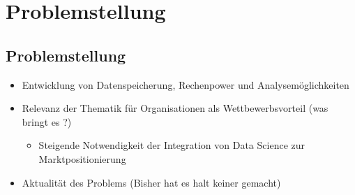 \chapter[Problemstellung]{Problemstellung}

\section{Problemstellung}

\begin{itemize}
    \item Entwicklung von Datenspeicherung, Rechenpower und Analysemöglichkeiten
    \item Relevanz der Thematik für Organisationen als Wettbewerbsvorteil (was bringt es ?) 
    \begin{itemize}
        \item Steigende Notwendigkeit der Integration von Data Science zur Marktpositionierung
    \end{itemize}
    \item Aktualität des Problems (Bisher hat es halt keiner gemacht)
\end{itemize}